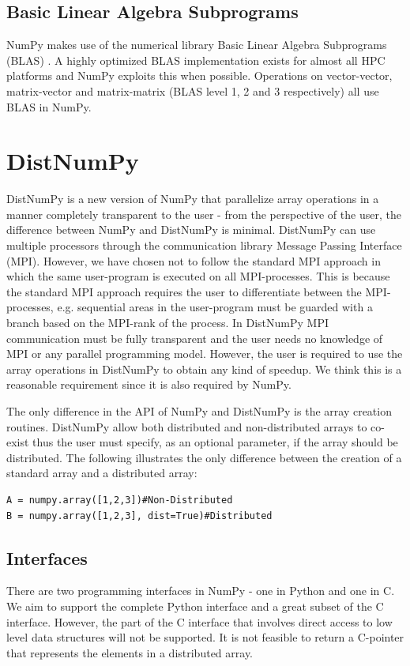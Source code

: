 \documentclass[10pt]{article}
\begin{document}
\subsection{Basic Linear Algebra Subprograms}
NumPy makes use of the numerical library Basic Linear Algebra Subprograms (BLAS) \cite{blas79}. A highly optimized BLAS implementation exists for almost all HPC platforms and NumPy exploits this when possible. Operations on vector-vector, matrix-vector and matrix-matrix (BLAS level 1, 2 and 3 respectively) all use BLAS in NumPy. 


\section{DistNumPy}
DistNumPy is a new version of NumPy that parallelize array operations in a manner completely transparent to the user - from the perspective of the user, the difference between NumPy and DistNumPy is minimal. DistNumPy can use multiple processors through the communication library Message Passing Interface (MPI)\cite{mpi}. However, we have chosen not to follow the standard MPI approach in which the same user-program is executed on all MPI-processes. This is because the standard MPI approach requires the user to differentiate between the MPI-processes, e.g. sequential areas in the user-program must be guarded with a branch based on the MPI-rank of the process. In DistNumPy MPI communication must be fully transparent and the user needs no knowledge of MPI or any parallel programming model. However, the user is required to use the array operations in DistNumPy to obtain any kind of speedup. We think this is a reasonable requirement since it is also required by NumPy.

The only difference in the API of NumPy and DistNumPy is the array creation routines. DistNumPy allow both distributed and non-distributed arrays to co-exist thus the user must specify, as an optional parameter, if the array should be distributed. The following illustrates the only difference between the creation of a standard array and a distributed array:
\lstset{frame=none, xleftmargin=0mm, numbers=none}
\begin{lstlisting}
A = numpy.array([1,2,3])#Non-Distributed
B = numpy.array([1,2,3], dist=True)#Distributed
\end{lstlisting}
\lstset{frame=single, xleftmargin=5mm, numbers=left}


\subsection{Interfaces}
There are two programming interfaces in NumPy - one in Python and one in C. We aim to support the complete Python interface and a great subset of the C interface. However, the part of the C interface that involves direct access to low level data structures will not be supported. It is not feasible to return a C-pointer that represents the elements in a distributed array.
\end{document}

